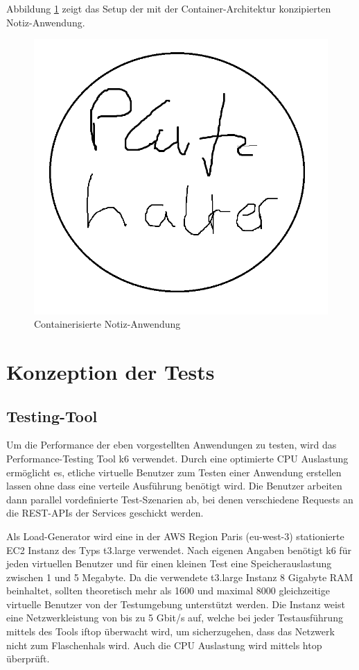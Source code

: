 Abbildung \ref{fig:notes-container} zeigt das Setup der mit der Container-Architektur konzipierten Notiz-Anwendung.

\begin{figure}[H]
    \includegraphics[width=\textwidth]{img/platzhalter.png}
    \caption[Containerisierte Notiz-Anwendung]{Containerisierte Notiz-Anwendung}
    \label{fig:notes-container}
\end{figure}

\section{Konzeption der Tests}

\subsection{Testing-Tool}
Um die Performance der eben vorgestellten Anwendungen zu testen, wird das Performance-Testing Tool k6 \cite{noauthor_load_nodate} verwendet. Durch eine optimierte CPU Auslastung ermöglicht es, etliche virtuelle Benutzer zum Testen einer Anwendung erstellen lassen ohne dass eine verteile Ausführung benötigt wird\cite{noauthor_running_nodate}. Die Benutzer arbeiten dann parallel vordefinierte Test-Szenarien ab, bei denen verschiedene Requests an die REST-APIs der Services geschickt werden. 

Als Load-Generator wird eine in der AWS Region Paris (eu-west-3) stationierte EC2 Instanz des Typs t3.large verwendet.
Nach eigenen Angaben benötigt k6 für jeden virtuellen Benutzer und für einen kleinen Test eine Speicherauslastung zwischen 1 und 5 Megabyte\cite{noauthor_running_nodate}. Da die verwendete t3.large Instanz 8 Gigabyte RAM beinhaltet, sollten theoretisch mehr als 1600 und maximal 8000 gleichzeitige virtuelle Benutzer von der Testumgebung unterstützt werden. Die Instanz weist eine Netzwerkleistung von bis zu 5 Gbit/s auf, welche bei jeder Testausführung mittels des Tools iftop überwacht wird, um sicherzugehen, dass das Netzwerk nicht zum Flaschenhals wird. Auch die CPU Auslastung wird mittels htop überprüft.

